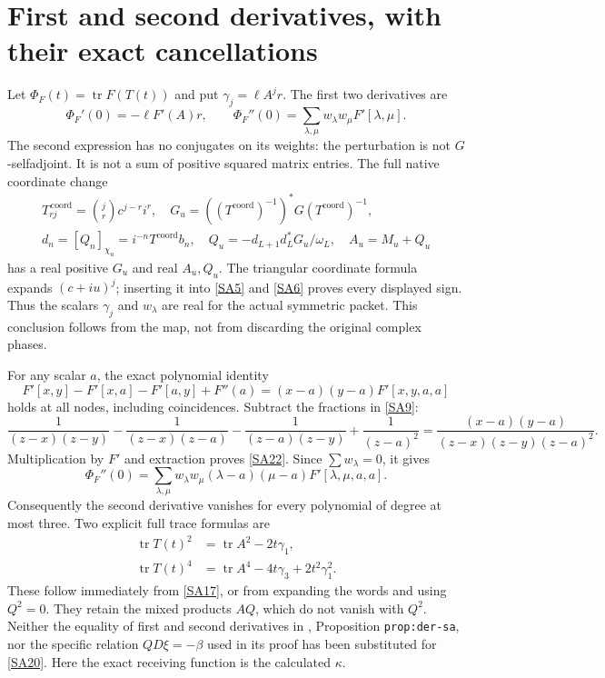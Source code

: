 \documentclass[11pt]{article}
\newcommand{\tr}{\operatorname{tr}}\newcommand{\Res}{\operatorname{Res}}
\begin{document}
\section{First and second derivatives, with their exact cancellations}

Let $\Phi_F(t)=\tr F(T(t))$ and put $\gamma_j=\ell A^jr$.
The first two derivatives are
\begin{equation}\tag{SA20}\label{SA20}
\Phi_F'(0)=-\ell F'(A)r,\qquad
\Phi_F''(0)=
\sum_{\lambda,\mu}w_\lambda w_\mu F'[\lambda,\mu].
\end{equation}
The second expression has no conjugates on its weights:
the perturbation is not $G$-selfadjoint. It is not a sum
of positive squared matrix entries.
The full native coordinate change
\begin{equation}\tag{SA21}\label{SA21}
\begin{gathered}
T_{rj}^{\,\mathrm{coord}}=\binom jr c^{j-r}i^r,\quad
G_u=((T^{\mathrm{coord}})^{-1})^*G
                 (T^{\mathrm{coord}})^{-1},\\
d_n=[Q_n]_{\chi_u}=i^{-n}T^{\mathrm{coord}}b_n,\quad
Q_u=-d_{L+1}d_L^*G_u/\omega_L,\quad
A_u=M_u+Q_u
\end{gathered}
\end{equation}
has a real positive $G_u$ and real $A_u,Q_u$.
The triangular coordinate formula expands $(c+iu)^j$;
inserting it into \eqref{SA5} and \eqref{SA6} proves
every displayed sign. Thus the scalars $\gamma_j$ and
$w_\lambda$ are real for the actual symmetric packet.
This conclusion follows from the map, not from discarding
the original complex phases.

For any scalar $a$, the exact polynomial identity
\begin{equation}\tag{SA22}\label{SA22}
F'[x,y]-F'[x,a]-F'[a,y]+F''(a)
=(x-a)(y-a)F'[x,y,a,a]
\end{equation}
holds at all nodes, including coincidences.
Subtract the fractions in \eqref{SA9}:
\[
\frac1{(z-x)(z-y)}
-\frac1{(z-x)(z-a)}
-\frac1{(z-a)(z-y)}
+\frac1{(z-a)^2}
=\frac{(x-a)(y-a)}
       {(z-x)(z-y)(z-a)^2}.
\]
Multiplication by $F'$ and extraction proves
\eqref{SA22}. Since $\sum w_\lambda=0$, it gives
\begin{equation}\tag{SA23}\label{SA23}
\Phi_F''(0)=
\sum_{\lambda,\mu}w_\lambda w_\mu
(\lambda-a)(\mu-a)F'[\lambda,\mu,a,a].
\end{equation}
Consequently the second derivative vanishes for every
polynomial of degree at most three. Two explicit full
trace formulas are
\begin{equation}\tag{SA24}\label{SA24}
\begin{split}
\tr T(t)^2&=\tr A^2-2t\gamma_1,\\
\tr T(t)^4&=\tr A^4-4t\gamma_3+2t^2\gamma_1^2 .
\end{split}
\end{equation}
These follow immediately from \eqref{SA17}, or from
expanding the words and using $Q^2=0$. They retain the
mixed products $AQ$, which do not vanish with $Q^2$.
Neither the equality of first and second derivatives
in \cite{CV}, Proposition \texttt{prop:der-sa}, nor the
specific relation $QD\xi=-\beta$ used in its proof has
been substituted for \eqref{SA20}. Here the exact
receiving function is the calculated $\kappa$.
\end{document}
